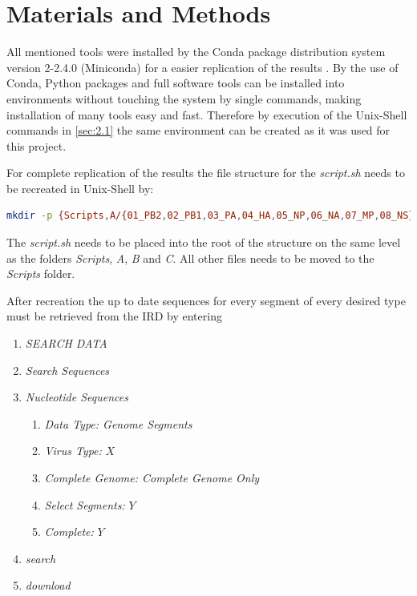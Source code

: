 \chapter{Materials and Methods} \label{chap:2}

    All mentioned tools were installed by the Conda package distribution system version 2-2.4.0 (Miniconda) for a easier replication of the results \autocite{Conda}. By the use of Conda, Python packages and full software tools can be installed into environments without touching the system by single commands, making installation of many tools easy and fast. Therefore by execution of the Unix-Shell commands in \autoref{sec:2.1} the same environment can be created as it was used for this project.
    
    For complete replication of the results the file structure for the \textit{script.sh} needs to be recreated in Unix-Shell by:
    
    \begin{lstlisting}[language=sh]
mkdir -p {Scripts,A/{01_PB2,02_PB1,03_PA,04_HA,05_NP,06_NA,07_MP,08_NS},B/{01_PB1,02_PB2,03_PA,04_HA,05_NP,06_NA_NB,07_M1_BM2,08_NS},C/{01_PB2,02_PB1,03_P3,04_HE,05_NP,06_M1_CM2,07_NS}}\end{lstlisting}  

    The \textit{script.sh} needs to be placed into %
    the root of the structure on the same level as the folders \textit{Scripts}, \textit{A}, \textit{B} and \textit{C}. All other files needs to be moved to the \textit{Scripts} folder. 

    After recreation the up to date sequences for every segment of every desired type must be retrieved from the \gls{IRD} by entering
    
    \begin{enumerate}[noitemsep]
        \item \textit{SEARCH DATA}
        \item \textit{Search Sequences}
        \item \textit{Nucleotide Sequences}
        \begin{enumerate}[noitemsep]
            \item \textit{Data Type: Genome Segments}
            \item \textit{Virus Type:} $X$
            \item \textit{Complete Genome: Complete Genome Only}
            \item \textit{Select Segments:} $Y$
            \item \textit{Complete:} $Y$
        \end{enumerate}
        \item \textit{search}
        \item \textit{download}
    \end{enumerate}
    
